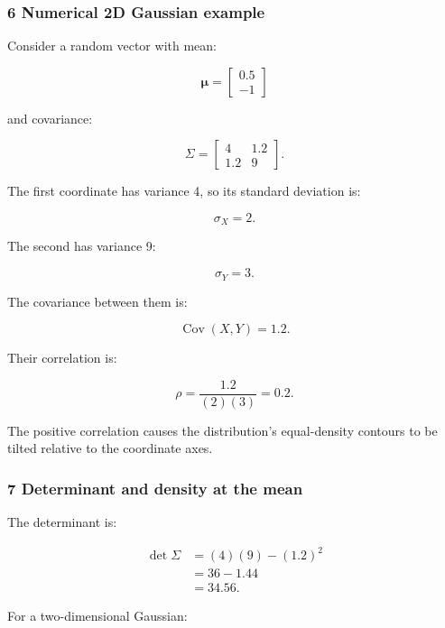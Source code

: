 \subsubsection{6 Numerical 2D Gaussian example}\label{02-foundations-ii-ch024-numerical-2d-gaussian-example}

\hypertarget{02-foundations-ii-ch024-numerical-2d-gaussian-example}{}

Consider a random vector with mean:

\[
 \boldsymbol\mu= \begin{bmatrix} 0.5\\-1 \end{bmatrix}
\]

and covariance:

\[
 \boxed{ \Sigma= \begin{bmatrix} 4&1.2\\ 1.2&9 \end{bmatrix} }.
\]

The first coordinate has variance 4, so its standard deviation is:

\[
 \sigma_X=2.
\]

The second has variance 9:

\[
 \sigma_Y=3.
\]

The covariance between them is:

\[
 \operatorname{Cov}(X,Y)=1.2.
\]

Their correlation is:

\[
 \rho=\frac{1.2}{(2)(3)} =\boxed{0.2}.
\]

The positive correlation causes the distribution's equal-density contours to be tilted relative to the coordinate axes.

\subsubsection{7 Determinant and density at the mean}\label{02-foundations-ii-ch024-determinant-and-density-at-the-mean}

\hypertarget{02-foundations-ii-ch024-determinant-and-density-at-the-mean}{}

The determinant is:

\[
 \begin{aligned} \det\Sigma &=(4)(9)-(1.2)^2\\ &=36-1.44\\ &=\boxed{34.56}. \end{aligned}
\]

For a two-dimensional Gaussian:


